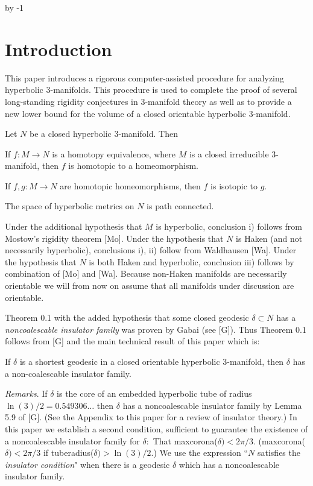 
\advance\sectioncount by -1
\section{Introduction}
 
This paper introduces a rigorous computer-assisted procedure for analyzing 
hyperbolic
$3$-manifolds.  This procedure is used to complete the proof of several 
long-standing
rigidity conjectures in $3$-manifold theory as well as to provide a new lower
bound for
the volume of a closed orientable hyperbolic $3$-manifold. 

 Let $N$ be a closed hyperbolic $3$\/{\rm -}\/manifold. Then
 \begin{itemize}
 If $f\colon M \to N$ is a homotopy equivalence{\rm ,} where $M$ is a closed
irreducible $3$\/{\rm -}\/manifold{\rm ,} then $f$ is homotopic to a homeomorphism.

 If $f,g\colon M\to N$ are homotopic homeomorphisms{\rm ,} then $f$ is
isotopic to $g$.

  The space of hyperbolic metrics on $N$ is path connected.
\end{itemize}
\endproclaim



  Under the additional hypothesis that $M$ is 
hyperbolic,  conclusion i) follows from
Mostow's rigidity theorem [Mo].  
Under the hypothesis that $N$ is Haken (and not necessarily
hyperbolic), 
conclusions i), ii) follow from Waldhausen [Wa].  
Under the hypothesis that $N$ is both Haken and
hyperbolic, conclusion iii) follows by combination of  [Mo] and [Wa].  
Because non-Haken
manifolds are necessarily orientable we will from now on assume that all
manifolds under discussion are orientable.
\enddemo

Theorem 0.1 with the added hypothesis that some closed geodesic
$\delta \subset N$ has a
{\it noncoalescable insulator family} was proven by  Gabai (see [G]).  Thus
Theorem 0.1 follows from [G] and the main technical result of this paper
which is:
 
   If $\delta$ is a shortest geodesic in a closed 
orientable hyperbolic $3$\/{\rm -}\/manifold{\rm ,} then $\delta$ has a 
non{\rm -}coalescable insulator family.
\endproclaim

{\it Remarks}.   If $\delta$ is the core of an embedded hyperbolic 
tube of radius\break
$\ln(3)/2 =  0.549306\ldots$ then $\delta$ has a noncoalescable insulator 
family by
Lemma 5.9 of [G].  (See the Appendix to this paper for a review of insulator 
theory.)  In this 
paper we establish a
second condition, sufficient to guarantee the existence of a noncoalescable  insulator family
for $\delta:$ That {maxcorona}($\delta) < 2\pi/3$. 
(maxcorona($\delta)<2\pi/3$ if tuberadius($\delta)>\ln(3)/2$.)
We use the expression ``$N$ satisfies the {\it insulator condition}"
when there is a geodesic $\delta$ which has a noncoalescable  insulator 
family.

